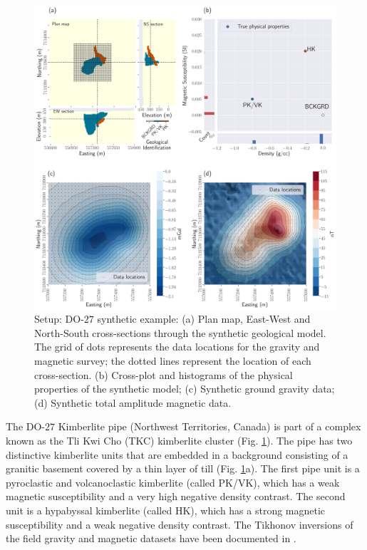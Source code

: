 \documentclass[extra, mreferee]{gji_joint} %
\begin{document}
\begin{figure}
    \centering
    \includegraphics[width=\textwidth]{Fig/LowRes/TKC_Setup_Synthetic.png}
    \caption{Setup: DO-$27$ synthetic example: (a) Plan map, East-West and North-South cross-sections through the synthetic geological model. The grid of dots represents the data locations for the gravity and magnetic survey; the dotted lines represent the location of each cross-section. (b) Cross-plot and histograms of the physical properties of the synthetic model; (c) Synthetic ground gravity data; (d) Synthetic total amplitude magnetic data.}
    \label{fig:TKC_Setup_Synthetic.png}
\end{figure}

The DO-$27$ Kimberlite pipe (Northwest Territories, Canada) is part of a complex known as the Tli Kwi Cho (TKC) kimberlite cluster \citep{JansenEtAl2004} (Fig. \ref{fig:TKC_Setup_Synthetic.png}). The pipe has two distinctive kimberlite units that are embedded in a background consisting of a granitic basement covered by a thin layer of till (Fig. \ref{fig:TKC_Setup_Synthetic.png}a). The first pipe unit is a pyroclastic and volcanoclastic kimberlite (called PK/VK), which has a weak magnetic susceptibility and a very high negative density contrast. The second unit is a hypabyssal kimberlite (called HK), which has a strong magnetic susceptibility and a weak negative density contrast. The Tikhonov inversions of the field gravity and magnetic datasets have been documented in \citet{TKCpaper}.
\end{document}
